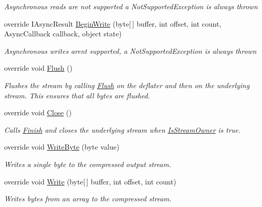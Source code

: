 \begin{DoxyCompactItemize}
\begin{DoxyCompactList}\small\item\em Asynchronous reads are not supported a Not\+Supported\+Exception is always thrown \end{DoxyCompactList}\item 
override I\+Async\+Result \hyperlink{class_i_c_sharp_code_1_1_sharp_zip_lib_1_1_zip_1_1_compression_1_1_streams_1_1_deflater_output_stream_aaecb4a3c808b5ff72cc3dddaad767918}{Begin\+Write} (byte\mbox{[}$\,$\mbox{]} buffer, int offset, int count, Async\+Callback callback, object state)
\begin{DoxyCompactList}\small\item\em Asynchronous writes arent supported, a Not\+Supported\+Exception is always thrown \end{DoxyCompactList}\item 
override void \hyperlink{class_i_c_sharp_code_1_1_sharp_zip_lib_1_1_zip_1_1_compression_1_1_streams_1_1_deflater_output_stream_a11795f61f58c5ee2d9fb8a33d8ea0d7e}{Flush} ()
\begin{DoxyCompactList}\small\item\em Flushes the stream by calling \hyperlink{class_i_c_sharp_code_1_1_sharp_zip_lib_1_1_zip_1_1_compression_1_1_streams_1_1_deflater_output_stream_a11795f61f58c5ee2d9fb8a33d8ea0d7e}{Flush} on the deflater and then on the underlying stream. This ensures that all bytes are flushed. \end{DoxyCompactList}\item 
override void \hyperlink{class_i_c_sharp_code_1_1_sharp_zip_lib_1_1_zip_1_1_compression_1_1_streams_1_1_deflater_output_stream_a9c7b7ad6415b77846d1a68e87ae55b8e}{Close} ()
\begin{DoxyCompactList}\small\item\em Calls \hyperlink{class_i_c_sharp_code_1_1_sharp_zip_lib_1_1_zip_1_1_compression_1_1_streams_1_1_deflater_output_stream_ac81f3e741a1ffdf98c02a171ad7cb334}{Finish} and closes the underlying stream when \hyperlink{class_i_c_sharp_code_1_1_sharp_zip_lib_1_1_zip_1_1_compression_1_1_streams_1_1_deflater_output_stream_a741aa9d79b2ebbb0fcd88d951935fd88}{Is\+Stream\+Owner} is true. \end{DoxyCompactList}\item 
override void \hyperlink{class_i_c_sharp_code_1_1_sharp_zip_lib_1_1_zip_1_1_compression_1_1_streams_1_1_deflater_output_stream_aeca95258efab3e3e1d03cac35c3b5815}{Write\+Byte} (byte value)
\begin{DoxyCompactList}\small\item\em Writes a single byte to the compressed output stream. \end{DoxyCompactList}\item 
override void \hyperlink{class_i_c_sharp_code_1_1_sharp_zip_lib_1_1_zip_1_1_compression_1_1_streams_1_1_deflater_output_stream_a7e12e55ebbeacb9b0021246ca76772fe}{Write} (byte\mbox{[}$\,$\mbox{]} buffer, int offset, int count)
\begin{DoxyCompactList}\small\item\em Writes bytes from an array to the compressed stream. \end{DoxyCompactList}\end{DoxyCompactItemize}

